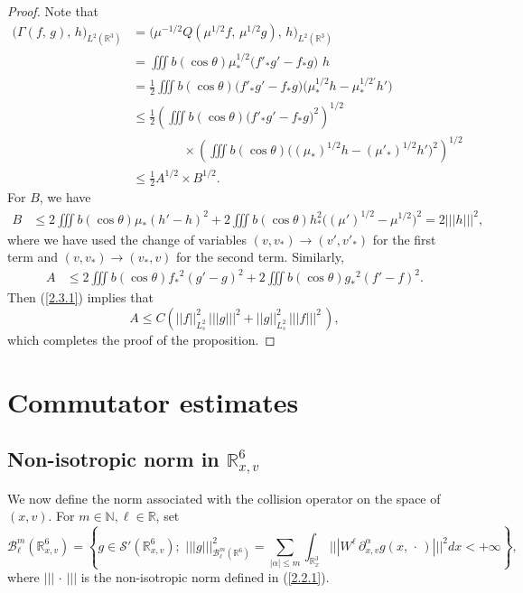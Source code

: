 \documentclass{amsart}[12pt, article]
\begin{document}
\begin{proof} Note that
\begin{align*}
\Big(\Gamma (f,\, g) ,\, h\Big)_{L^2({{{\mathbb R}}}^3)} &= \Big(\mu^{-1/2}Q
(\mu^{1/2} f,\, \mu^{1/2} g ),\,  h\Big)_{L^2({{{\mathbb R}}}^3)}\\
&= \iiint b(\cos\theta) \mu^{1/2}_\ast \Big( f'_\ast g' - f_\ast g
\Big)\,\,h\\
& =\frac 12 \iiint b(\cos\theta) \Big(f'_\ast g' - f_\ast g\Big)
\Big( \mu^{1/2}_\ast h - \mu^{1/2 '}_\ast h' \Big)\\
&\leq \frac 12 \left(\iiint b (\cos\theta) \Big(f'_\ast g'- f_\ast
g\Big)^2 \right)^{1/2}\\
&\qquad\qquad\times \left( \iiint b (\cos\theta) \Big((\mu_*)^{1/2}
h - (\mu'_*)^{1/2} h' \Big)^2 \right)^{1/2}\\
&\leq \frac 12  A^{1/2}\times B^{1/2}.
\end{align*}
For $B$, we have
\begin{align*}
B
&\leq 2 \iiint b(\cos\theta) \mu_\ast (h'-h)^2 +  2 \iiint
b(\cos\theta) h^2_\ast \Big((\mu')^{1/2} -\mu^{1/2} \Big)^2 = 2 |||
h|||^2,
\end{align*}
where we have used the change of variables $(v,v_\ast )\rightarrow (v',v'_\ast )$ for the first
term and $(v,v_\ast )\rightarrow (v_*,v)$ for the second term. Similarly,
\begin{align*}
A
&\leq 2 \iiint b(\cos\theta) {f_*}^{2} (g'-g)^2+ 2 \iiint
b(\cos\theta) {g_*}^{2} (f'-f)^2.
\end{align*}
Then (\ref{2.3.1}) implies that
$$
A\leq C\left( || f||^2_{L^2_s} \,
||| g|||^2+ || g||^2_{L^2_s}\, ||| f|||^2\, \right),
$$
which completes the proof of the proposition.
\end{proof}

\section{Commutator estimates}\label{section3}
\smallbreak

\subsection{Non-isotropic norm in ${{{\mathbb R}}}^6_{x,v}$}\label{section3.1}
\setcounter{equation}{0} \smallbreak

We now define the norm associated with the collision operator on the
space of  $(x, v)$.  For $m\in{{\mathbb N}}, \ell\in {{{\mathbb R}}}$, set
$$
{{\mathcal B}}^m_\ell({{{\mathbb R}}}^6_{x, v})=\left\{ g\in{{\mathcal S}}'({{{\mathbb R}}}^6_{x, v});\,\,
|||g|||^2_{{{\mathcal B}}^m_\ell({{{\mathbb R}}}^6)}=\sum_{|\alpha|\leq m}\int_{{{{\mathbb R}}}^3_x}|||W^\ell\,
\partial^\alpha_{x, v} g(x,\, \cdot\,)|||^2dx <+\infty\right\},
$$
where $|||\,\cdot\,|||$ is the non-isotropic norm
defined in (\ref{2.2.1}).
\end{document}
